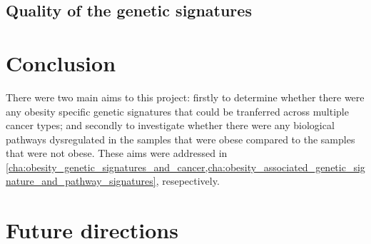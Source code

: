 \subsection{Quality of the genetic signatures}
\label{sub:quality_of_the_genetic_signatures}










\section{Conclusion}
\label{sec:conclusion}

There were two main aims to this project: firstly to determine whether there were any obesity specific genetic signatures that could be tranferred across multiple cancer types; and secondly to investigate whether there were any biological pathways dysregulated in the samples that were obese compared to the samples that were not obese.
These aims were addressed in \cref{cha:obesity_genetic_signatures_and_cancer,cha:obesity_associated_genetic_signature_and_pathway_signatures}, resepectively.
\\

\noindent





\section{Future directions}
\label{sec:future_directions}













